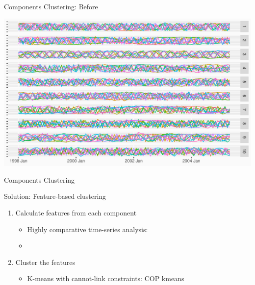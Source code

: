 \documentclass[14pt,ignorenonframetext,]{beamer}
\providecommand{\tightlist}{%
  \setlength{\itemsep}{0pt}\setlength{\parskip}{0pt}}
\begin{document}
\begin{frame}{Components Clustering: Before}
\protect\hypertarget{components-clustering-before}{}
\begin{center}
\includegraphics[width=\linewidth]{plot/p_cluster_before}
\end{center}
\end{frame}

\begin{frame}{Components Clustering}
\protect\hypertarget{components-clustering-1}{}
\begin{block}{Solution: Feature-based clustering}
\protect\hypertarget{solution-feature-based-clustering}{}
\begin{enumerate}
\tightlist
\item
  Calculate features from each component

  \begin{itemize}
  \tightlist
  \item
    Highly comparative time-series analysis: \citet{Fulcher2017-zl}
  \item
    \citet{Talagala2023-yi}
  \end{itemize}
\item
  Cluster the features

  \begin{itemize}
  \tightlist
  \item
    K-means with cannot-link constraints: COP kmeans
    \citet{Wagstaff2001-vc}
  \end{itemize}
\end{enumerate}
\end{block}
\end{frame}
\end{document}
